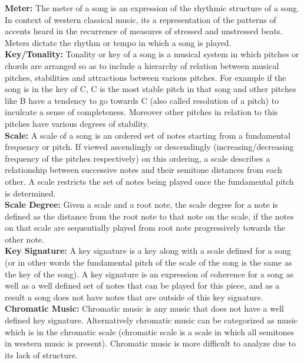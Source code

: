 \noindent \textbf{Meter:} The meter of a song is an expression of the rhythmic structure of a song. In context of western classical music, its a representation of the patterns of accents heard in the recurrence of measures of stressed and unstressed beats. Meters dictate the rhythm or tempo in which a song is played. \\

\noindent \textbf{Key/Tonality:} Tonality or key of a song is a musical system in which pitches or chords are arranged so as to include a hierarchy of relation between musical pitches, stabilities and attractions between various pitches. For example if the song is in the key of C, C is the most stable pitch in that song and other pitches like B have a tendency to go towards C (also called resolution of a pitch) to inculcate a sense of completeness. Moreover other pitches in relation to this pitches have various degrees of stability. \\

\noindent \textbf{Scale:} A scale of a song is an ordered set of notes starting from a fundamental frequency or pitch. If viewed ascendingly or descendingly (increasing/decreasing frequency of the pitches respectively) on this ordering, a scale describes a relationship between successive notes and their semitone distances from each other. A scale restricts the set of notes being played once the fundamental pitch is determined. \\

\noindent \textbf{Scale Degree:} Given a scale and a root note, the scale degree for a note is defined as the distance from the root note to that note on the scale, if the notes on that scale are sequentially played from root note progressively towards the other note. \\

\noindent \textbf{Key Signature:} A key signature is a key along with a scale defined for a song (or in other words the fundamental pitch of the scale of the song is the same as the key of the song). A key signature is an expression of coherence for a song as well as a well defined set of notes that can be played for this piece, and as a result a song does not have notes that are outside of this key signature. \\

\noindent \textbf{Chromatic Music:} Chromatic music is any music that does not have a well defined key signature. Alternatively chromatic music can be categorized as music which is in the chromatic scale (chromatic scale is a scale in which all semitones in western music is present). Chromatic music is more difficult to analyze due to its lack of structure. \\

